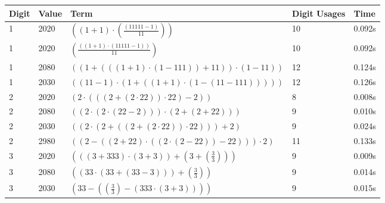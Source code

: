 \documentclass{article}
\theoremstyle{nonumberplain}
\begin{document}
%
\begin{center}
    \begin{longtable}{ | l | l | p{9.5cm} | l | l | }
    \hline \textbf{Digit} & \textbf{Value} & \textbf{Term} & \textbf{Digit Usages} & \textbf{Time} \\\hline
        1 & 2020 & \( \left(\left(1 + 1\right) \cdot \left(\frac{\left(11111 - 1\right)}{11}\right)\right) \) & 10 & 0.092s \\\hline
        1 & 2020 & \( \left(\frac{\left(\left(1 + 1\right) \cdot \left(11111 - 1\right)\right)}{11}\right) \) & 10 & 0.092s \\\hline
        1 & 2080 & \( \left(\left(1 + \left(\left(\left(1 + 1\right) \cdot \left(1 - 111\right)\right) + 11\right)\right) \cdot \left(1 - 11\right)\right) \) & 12 & 0.124s \\\hline
        1 & 2030 & \( \left(\left(11 - 1\right) \cdot \left(1 + \left(\left(1 + 1\right) \cdot \left(1 - \left(11 - 111\right)\right)\right)\right)\right) \) & 12 & 0.126s \\\hline
        2 & 2020 & \( \left(2 \cdot \left(\left(\left(2 + \left(2 \cdot 22\right)\right) \cdot 22\right) - 2\right)\right) \) & 8 & 0.008s \\\hline
        2 & 2080 & \( \left(\left(2 \cdot \left(2 \cdot \left(22 - 2\right)\right)\right) \cdot \left(2 + \left(2 + 22\right)\right)\right) \) & 9 & 0.010s \\\hline
        2 & 2030 & \( \left(\left(2 \cdot \left(2 + \left(\left(2 + \left(2 \cdot 22\right)\right) \cdot 22\right)\right)\right) + 2\right) \) & 9 & 0.024s \\\hline
        2 & 2980 & \( \left(\left(2 - \left(\left(2 + 22\right) \cdot \left(\left(2 \cdot \left(2 - 22\right)\right) - 22\right)\right)\right) \cdot 2\right) \) & 11 & 0.133s \\\hline
        3 & 2020 & \( \left(\left(\left(3 + 333\right) \cdot \left(3 + 3\right)\right) + \left(3 + \left(\frac{3}{3}\right)\right)\right) \) & 9 & 0.009s \\\hline
        3 & 2080 & \( \left(\left(33 \cdot \left(33 + \left(33 - 3\right)\right)\right) + \left(\frac{3}{3}\right)\right) \) & 9 & 0.014s \\\hline
        3 & 2030 & \( \left(33 - \left(\left(\frac{3}{3}\right) - \left(333 \cdot \left(3 + 3\right)\right)\right)\right) \) & 9 & 0.015s \\\hline

\end{longtable}
\end{center}
\end{document}
